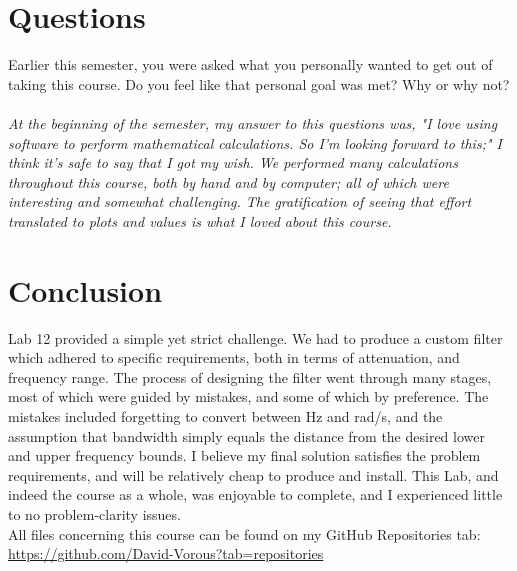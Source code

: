 \documentclass[12pt]{report}
\begin{document}
\section{Questions}
Earlier this semester, you were asked what you personally wanted to get out of taking this course. Do you feel like that personal goal was met? Why or why not?\\~\\
\textit{At the beginning of the semester, my answer to this questions was, "I love using software to perform mathematical calculations. So I'm looking forward to this;" I think it's safe to say that I got my wish. We performed many calculations throughout this course, both by hand and by computer; all of which were interesting and somewhat challenging. The gratification of seeing that effort translated to plots and values is what I loved about this course.}

\section{Conclusion}
Lab 12 provided a simple yet strict challenge. We had to produce a custom filter which adhered to specific requirements, both in terms of attenuation, and frequency range. The process of designing the filter went through many stages, most of which were guided by mistakes, and some of which by preference. The mistakes included forgetting to convert between Hz and rad/s, and the assumption that bandwidth simply equals the distance from the desired lower and upper frequency bounds. I believe my final solution satisfies the problem requirements, and will be relatively cheap to produce and install. This Lab, and indeed the course as a whole, was enjoyable to complete, and I experienced little to no problem-clarity issues.\\

All files concerning this course can be found on my GitHub Repositories tab:\\
\url{https://github.com/David-Vorous?tab=repositories}
\pagebreak
\end{document}

